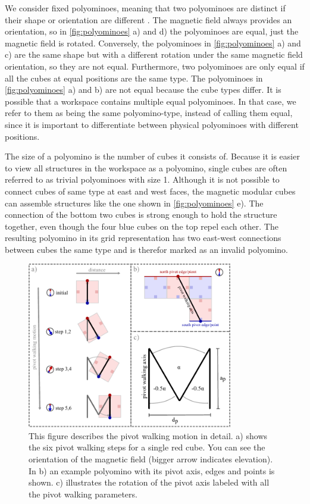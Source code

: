We consider fixed polyominoes, meaning that two polyominoes are distinct if their shape or orientation are different \cite{Lu2021}.
The magnetic field always provides an orientation, so in \autoref{fig:polyominoes} a) and d) the polyominoes are equal, just the magnetic field is rotated.
Conversely, the polyominoes in \autoref{fig:polyominoes} a) and c) are the same shape but with a different rotation under the same magnetic field orientation, so they are not equal.
Furthermore, two polyominoes are only equal if all the cubes at equal positions are the same type.
The polyominoes in \autoref{fig:polyominoes} a) and b) are not equal because the cube types differ.
It is possible that a workspace contains multiple equal polyominoes.
In that case, we refer to them as being the same polyomino-type, instead of calling them equal, since it is important to differentiate between physical polyominoes with different positions.

The size of a polyomino is the number of cubes it consists of.
Because it is easier to view all structures in the workspace as a polyomino, single cubes are often referred to as trivial polyominoes with size 1.
Although it is not possible to connect cubes of same type at east and west faces, the magnetic modular cubes can assemble structures like the one shown in \autoref{fig:polyominoes} e).
The connection of the bottom two cubes is strong enough to hold the structure together, even though the four blue cubes on the top repel each other.
The resulting polyomino in its grid representation has two east-west connections between cubes the same type and is therefor marked as an invalid polyomino.

\begin{figure}
	\centering
	\includegraphics[width=0.80\textwidth]{figures/pivot_walking.pdf}
	\caption[Illustration of the pivot walking motion]{This figure describes the pivot walking motion in detail. a) shows the six pivot walking steps for a single red cube. You can see the orientation of the magnetic field (bigger arrow indicates elevation). In b) an example polyomino with its pivot axis, edges and points is shown. c) illustrates the rotation of the pivot axis labeled with all the pivot walking parameters.}
	\label{fig:pivot_walking}
\end{figure}


